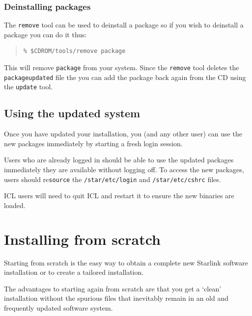 \documentclass[twoside,11pt]{article}
\newcommand{\xlabel}[1]{}
\renewcommand{\_}{\texttt{\symbol{95}}}
\begin{document}
\subsubsection{\xlabel{deinstalling_packages}Deinstalling packages}
\label{deinstalling_packages}

The \texttt{remove} tool can be used to deinstall a package so if you
wish to deinstall a package you can do it thus:

\begin{quote}
\begin{verbatim}
% $CDROM/tools/remove package
\end{verbatim}
\end{quote}
 
This will remove \texttt{package} from your system.  Since the 
\texttt{remove} tool deletes the \texttt{package\_updated} file the
you can add the package back again from the CD using the 
\texttt{update} tool.

\subsection{\xlabel{using_the_updated_system}Using the updated system}
\label{using_the_updated_system}

Once you have updated your installation, you (and any other user) can
use the new packages immediately by starting a fresh login session.

Users who are already logged in should be able to use the updated
packages immediately they are available without logging off.  To access
the new packages, users should re\texttt{source} the \texttt{/star/etc/login}
and \texttt{/star/etc/cshrc} files.

ICL users will need to quit ICL and restart it to ensure the new binaries
are loaded.

\newpage
\section{\xlabel{installing_from_scratch}Installing from scratch}
\label{installing_from_scratch}

Starting from scratch is the easy way to obtain a complete new Starlink
software installation or to create a tailored installation.  

The advantages to starting again from scratch are that you get a `clean'
installation without the spurious files that inevitably remain in an old
and frequently updated software system.  
\end{document}

